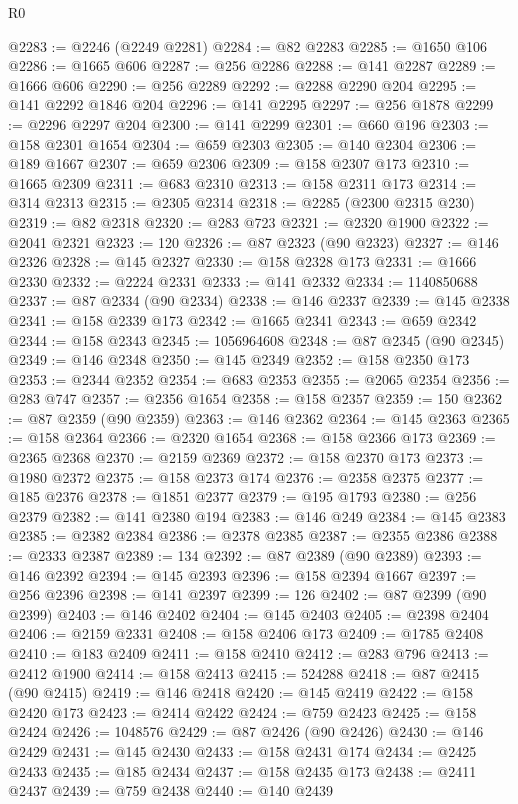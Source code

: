 \begin{lexlean}{R0}
\begin{coremodule}
@2283 := @2246 (@2249 @2281)
@2284 := @82 @2283
@2285 := @1650 @106
@2286 := @1665 @606
@2287 := @256 @2286
@2288 := @141 @2287
@2289 := @1666 @606
@2290 := @256 @2289
@2292 := @2288 @2290 @204
@2295 := @141 @2292 @1846 @204
@2296 := @141 @2295
@2297 := @256 @1878
@2299 := @2296 @2297 @204
@2300 := @141 @2299
@2301 := @660 @196
@2303 := @158 @2301 @1654
@2304 := @659 @2303
@2305 := @140 @2304
@2306 := @189 @1667
@2307 := @659 @2306
@2309 := @158 @2307 @173
@2310 := @1665 @2309
@2311 := @683 @2310
@2313 := @158 @2311 @173
@2314 := @314 @2313
@2315 := @2305 @2314
@2318 := @2285 (@2300 @2315 @230)
@2319 := @82 @2318
@2320 := @283 @723
@2321 := @2320 @1900
@2322 := @2041 @2321
@2323 := 120
@2326 := @87 @2323 (@90 @2323)
@2327 := @146 @2326
@2328 := @145 @2327
@2330 := @158 @2328 @173
@2331 := @1666 @2330
@2332 := @2224 @2331
@2333 := @141 @2332
@2334 := 1140850688
@2337 := @87 @2334 (@90 @2334)
@2338 := @146 @2337
@2339 := @145 @2338
@2341 := @158 @2339 @173
@2342 := @1665 @2341
@2343 := @659 @2342
@2344 := @158 @2343
@2345 := 1056964608
@2348 := @87 @2345 (@90 @2345)
@2349 := @146 @2348
@2350 := @145 @2349
@2352 := @158 @2350 @173
@2353 := @2344 @2352
@2354 := @683 @2353
@2355 := @2065 @2354
@2356 := @283 @747
@2357 := @2356 @1654
@2358 := @158 @2357
@2359 := 150
@2362 := @87 @2359 (@90 @2359)
@2363 := @146 @2362
@2364 := @145 @2363
@2365 := @158 @2364
@2366 := @2320 @1654
@2368 := @158 @2366 @173
@2369 := @2365 @2368
@2370 := @2159 @2369
@2372 := @158 @2370 @173
@2373 := @1980 @2372
@2375 := @158 @2373 @174
@2376 := @2358 @2375
@2377 := @185 @2376
@2378 := @1851 @2377
@2379 := @195 @1793
@2380 := @256 @2379
@2382 := @141 @2380 @194
@2383 := @146 @249
@2384 := @145 @2383
@2385 := @2382 @2384
@2386 := @2378 @2385
@2387 := @2355 @2386
@2388 := @2333 @2387
@2389 := 134
@2392 := @87 @2389 (@90 @2389)
@2393 := @146 @2392
@2394 := @145 @2393
@2396 := @158 @2394 @1667
@2397 := @256 @2396
@2398 := @141 @2397
@2399 := 126
@2402 := @87 @2399 (@90 @2399)
@2403 := @146 @2402
@2404 := @145 @2403
@2405 := @2398 @2404
@2406 := @2159 @2331
@2408 := @158 @2406 @173
@2409 := @1785 @2408
@2410 := @183 @2409
@2411 := @158 @2410
@2412 := @283 @796
@2413 := @2412 @1900
@2414 := @158 @2413
@2415 := 524288
@2418 := @87 @2415 (@90 @2415)
@2419 := @146 @2418
@2420 := @145 @2419
@2422 := @158 @2420 @173
@2423 := @2414 @2422
@2424 := @759 @2423
@2425 := @158 @2424
@2426 := 1048576
@2429 := @87 @2426 (@90 @2426)
@2430 := @146 @2429
@2431 := @145 @2430
@2433 := @158 @2431 @174
@2434 := @2425 @2433
@2435 := @185 @2434
@2437 := @158 @2435 @173
@2438 := @2411 @2437
@2439 := @759 @2438
@2440 := @140 @2439

\end{coremodule}
\end{lexlean}
